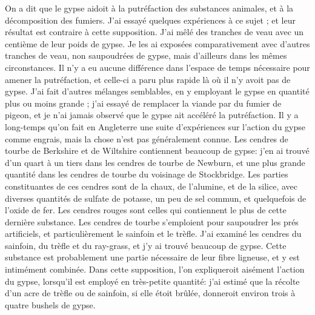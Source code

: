 On a dit que le gypse aidoit à la putréfaction des substances animales, et à la décomposition des fumiers. J'ai essayé quelques expériences à ce sujet ; et leur résultat est contraire à cette supposition.
J'ai mêlé des tranches de veau avec un centième de leur poids de gypse. Je les ai exposées comparativement avec d'autres tranches de veau, non saupoudrées de gypse, mais d'ailleurs dans les mêmes circonstances. Il n'y a eu aucune différence dans l'espace de temps nécessaire pour amener la putréfaction, et celle-ci a paru plus rapide là où il n'y avoit pas de gypse. J'ai fait d'autres mélanges semblables, en y employant le gypse en quantité plus ou moins grande ; j'ai essayé de remplacer la viande par du fumier de pigeon, et je n'ai jamais observé que le gypse ait accéléré la putréfaction.
Il y a long-temps qu'on fait en Angleterre\setcounter{page}{236} une suite d'expériences sur l'action du gypse comme engrais, mais la chose n'est pas généralement connue. Les cendres de tourbe de Berkshire et de Wiltshire contiennent beaucoup de gypse: j'en ai trouvé d'un quart à un tiers dans les cendres de tourbe de Newburn, et une plus grande quantité dans les cendres de tourbe du voisinage de Stockbridge. Les parties constituantes de ces cendres sont de la chaux, de l'alumine, et de la silice, avec diverses quantités de sulfate de potasse, un peu de sel commun, et quelquefois de l'oxide de fer. Les cendres rouges sont celles qui contiennent le plus de cette dernière substance. Les cendres de tourbe s'emploient pour saupoudrer les prés artificiels, et particulièrement le sainfoin et le trèfle. J'ai examiné les cendres du sainfoin, du trèfle et du ray-grass, et j'y ai trouvé beaucoup de gypse. Cette substance est probablement une partie nécessaire de leur fibre ligneuse, et y est intimément combinée. Dans cette supposition, l'on expliqueroit aisément l'action du gypse, lorsqu'il est employé en très-petite quantité: j'ai estimé que la récolte d'un acre de trèfle ou de sainfoin, si elle étoit brûlée, donneroit environ trois à quatre bushels de gypse.
